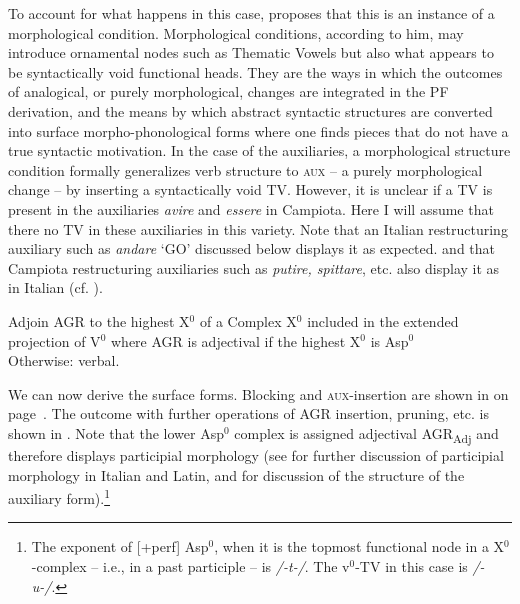 \documentclass[output=paper]{langscibook}
\begin{document}
{To account for what happens in this case, \citet{calabrese2019a, calabrese2020a} proposes  that this is an instance of a morphological condition. Morphological conditions, according to him, may introduce ornamental nodes such as Thematic Vowels but also what appears to be syntactically void functional heads. They are the ways in which the outcomes of analogical, or purely morphological, changes are integrated in the PF derivation, and the means by which abstract syntactic structures are converted into surface morpho-phonological forms where one finds pieces that do not have a true syntactic motivation. In the case of the auxiliaries, a morphological structure condition formally generalizes verb structure to \textsc{aux} --  a purely morphological change  --  by inserting a syntactically void TV. However, it is unclear if a TV is present in the auxiliaries \textit{avire} and \textit{essere} in Campiota. Here I will assume that there no TV in these auxiliaries in this variety.  Note that an Italian restructuring auxiliary such as \textit{andare} ‘GO’ discussed below displays it as expected. and that Campiota restructuring auxiliaries such as \textit{putire, spittare}, etc. also display it as in Italian (cf. ).}

\ea \label{ac75} Adjoin AGR to the highest X$^0$ of a Complex X$^0$ included in the extended projection of V$^0$
    \ea \label{ac75a}where AGR is adjectival if the highest X$^0$ is Asp$^0$\\
        Otherwise:
    \ex \label{ac75b}verbal.
   \z
\z

We can now derive the surface forms. Blocking and \textsc{aux}-insertion are shown in  on page~\pageref{ac76a}.  The outcome with further operations of AGR insertion, pruning, etc. is shown in .  Note that the lower Asp$^0$ complex is assigned adjectival AGR\textsubscript{Adj} and therefore displays participial morphology (see \citet{calabrese2020a} for further discussion of participial morphology in Italian and Latin, and \citet{calabrese2019a} for discussion of the structure of the auxiliary form).\footnote{The exponent of [+perf] Asp$^0$, when it is the topmost functional node in a X$^0$-complex -- i.e., in a past participle --  is \textit{/-t-/}.  The v$^0$-TV in this case is \textit{/-u-/}.}
\end{document}
